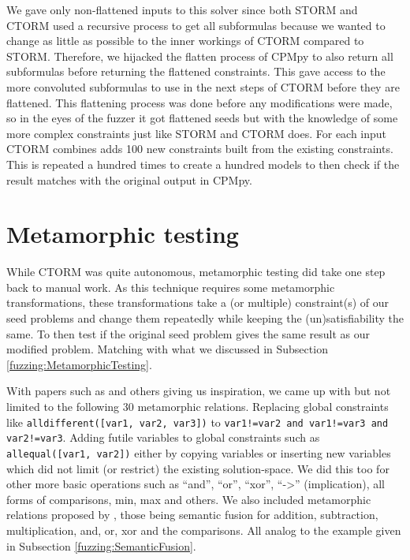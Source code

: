 We gave only non-flattened inputs to this solver since both STORM and CTORM used a recursive process to get all subformulas because we wanted to change as little as possible to the inner workings of CTORM compared to STORM. Therefore, we hijacked the flatten process of CPMpy to also return all subformulas before returning the flattened constraints. This gave access to the more convoluted subformulas to use in the next steps of CTORM before they are flattened. This flattening process was done before any modifications were made, so in the eyes of the fuzzer it got flattened seeds but with the knowledge of some more complex constraints just like STORM and CTORM does. For each input CTORM combines adds 100 new constraints built from the existing constraints. This is repeated a hundred times to create a hundred models to then check if the result matches with the original output in CPMpy.

%


\section{Metamorphic testing}
\label{impl:Meta}
While CTORM was quite autonomous, metamorphic testing did take one step back to manual work. As this technique requires some metamorphic transformations, these transformations take a (or multiple) constraint(s) of our seed problems and change them repeatedly while keeping the (un)satisfiability the same. To then test if the original seed problem gives the same result as our modified problem. Matching with what we discussed in Subsection \ref{fuzzing:MetamorphicTesting}. 

With papers such as \cite{50akgun2018metamorphic, 49usman2020testmc, 43YinYang} and others giving us inspiration, we came up with but not limited to the following 30 metamorphic relations. Replacing global constraints like \texttt{alldifferent([var1, var2, var3])} to \texttt{var1!=var2 and var1!=var3 and var2!=var3}. Adding futile variables to global constraints such as \texttt{allequal([var1, var2])} either by copying variables or inserting new variables which did not limit (or restrict) the existing solution-space. We did this too for other more basic operations such as “and”, “or”, “xor”, “->” (implication), all forms of comparisons, min, max and others. We also included metamorphic relations proposed by \cite{43YinYang}, those being semantic fusion for addition, subtraction, multiplication, and, or, xor and the comparisons. All analog to the example given in Subsection \ref{fuzzing:SemanticFusion}. 

